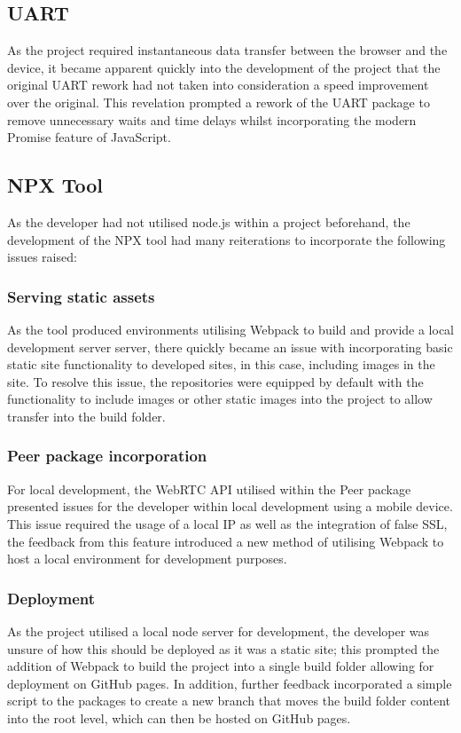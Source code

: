 \documentclass{l4proj}
\begin{document}
\subsection{UART}
As the project required instantaneous data transfer between the browser and the device, it became apparent quickly into the development of the project that the original UART rework had not taken into consideration a speed improvement over the original. This revelation prompted a rework of the UART package to remove unnecessary waits and time delays whilst incorporating the modern Promise feature of JavaScript.

\subsection{NPX Tool}
As the developer had not utilised node.js within a project beforehand, the development of the NPX tool had many reiterations to incorporate the following issues raised:
\subsubsection{Serving static assets}
As the tool produced environments utilising Webpack to build and provide a local development server server, there quickly became an issue with incorporating basic static site functionality to developed sites, in this case, including images in the site. To resolve this issue, the repositories were equipped by default with the functionality to include images or other static images into the project to allow transfer into the build folder.
\subsubsection{Peer package incorporation}
For local development, the WebRTC API utilised within the Peer package presented issues for the developer within local development using a mobile device. This issue required the usage of a local IP as well as the integration of false SSL, the feedback from this feature introduced a new method of utilising Webpack to host a local environment for development purposes.
\subsubsection{Deployment}
As the project utilised a local node server for development, the developer was unsure of how this should be deployed as it was a static site; this prompted the addition of Webpack to build the project into a single build folder allowing for deployment on GitHub pages. In addition, further feedback incorporated a simple script to the packages to create a new branch that moves the build folder content into the root level, which can then be hosted on GitHub pages.
\end{document}
